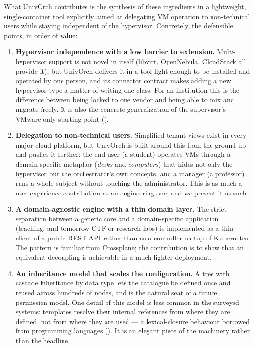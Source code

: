 What UnivOrch contributes is the synthesis of these ingredients in a
lightweight, single-container tool explicitly aimed at delegating VM
operation to non-technical users while staying independent of the
hypervisor. Concretely, the defensible points, in order of value:

\begin{enumerate}
  \item \textbf{Hypervisor independence with a low barrier to
        extension.} Multi-hypervisor support is not novel in itself
        (libvirt, OpenNebula, CloudStack all provide it), but UnivOrch
        delivers it in a tool light enough to be installed and operated
        by one person, and its connector contract makes adding a new
        hypervisor type a matter of writing one class. For an
        institution this is the difference between being locked to one
        vendor and being able to mix and migrate freely. It is also the
        concrete generalization of the supervisor's VMware-only
        starting point ().
  \item \textbf{Delegation to non-technical users.} Simplified tenant
        views exist in every major cloud platform, but UnivOrch is
        built around this from the ground up and pushes it further: the
        end user (a student) operates VMs through a domain-specific
        metaphor (\emph{desks} and \emph{computers}) that hides not
        only the hypervisor but the orchestrator's own concepts, and a
        manager (a professor) runs a whole subject without touching the
        administrator. This is as much a user-experience contribution
        as an engineering one, and we present it as such.
  \item \textbf{A domain-agnostic engine with a thin domain layer.}
        The strict separation between a generic core and a
        domain-specific application (teaching, and tomorrow CTF or
        research labs) is implemented as a thin client of a public REST
        API rather than as a controller on top of Kubernetes. The
        pattern is familiar from Crossplane; the contribution is to
        show that an equivalent decoupling is achievable in a much
        lighter deployment.
  \item \textbf{An inheritance model that scales the configuration.}
        A tree with cascade inheritance by data type lets the
        catalogue be defined once and reused across hundreds of nodes,
        and is the natural seat of a future permission model. One
        detail of this model is less common in the surveyed systems:
        templates resolve their internal references from where they
        are defined, not from where they are used --- a lexical-closure
        behaviour borrowed from programming languages
        (). It is an elegant piece of the machinery
        rather than the headline.
\end{enumerate}

